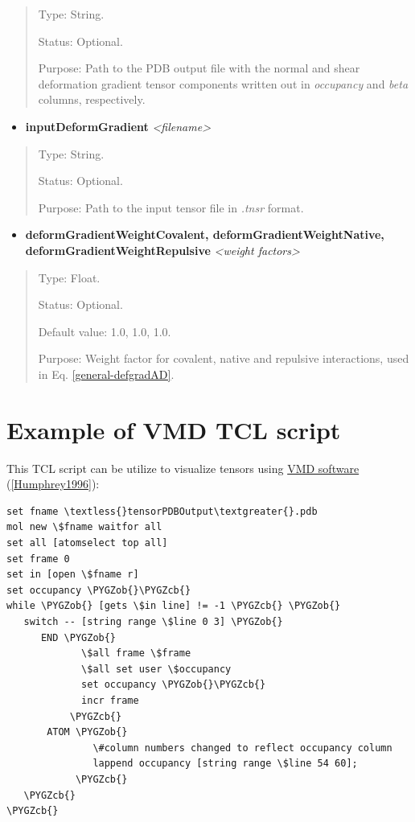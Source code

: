 \documentclass[letterpaper,10pt,english]{sphinxmanual}
\def\PYGZob{\char`\{}
\def\PYGZcb{\char`\}}
\begin{document}
\begin{quote}

Type: String.

Status: Optional.

Purpose:  Path to the PDB output file with the normal and shear deformation gradient tensor components written out in \emph{occupancy} and \emph{beta} columns, respectively.
\end{quote}
\begin{itemize}
\item {} 
\textbf{inputDeformGradient} \emph{\textless{}filename\textgreater{}}

\end{itemize}
\begin{quote}

Type: String.

Status: Optional.

Purpose:  Path to the input tensor file in \emph{.tnsr} format.
\end{quote}
\begin{itemize}
\item {} 
\textbf{deformGradientWeightCovalent, deformGradientWeightNative, deformGradientWeightRepulsive} \emph{\textless{}weight factors\textgreater{}}

\end{itemize}
\begin{quote}

Type: Float.

Status: Optional.

Default value: 1.0, 1.0, 1.0.

Purpose: Weight factor for covalent, native and repulsive interactions, used in Eq. \eqref{general-defgradAD}.
\end{quote}


\section{Example of VMD TCL script}
\label{general:example-of-vmd-tcl-script}\label{general:tclscrpt}
This TCL script can be utilize to visualize tensors using \href{http://www.ks.uiuc.edu/Research/vmd/}{VMD software} ({\hyperref[general:humphrey1996]{{[}Humphrey1996{]}}}):

\begin{Verbatim}[commandchars=\\\{\}]
set fname \textless{}tensorPDBOutput\textgreater{}.pdb
mol new \$fname waitfor all
set all [atomselect top all]
set frame 0
set in [open \$fname r]
set occupancy \PYGZob{}\PYGZcb{}
while \PYGZob{} [gets \$in line] != -1 \PYGZcb{} \PYGZob{}
   switch -- [string range \$line 0 3] \PYGZob{}
      END \PYGZob{}
             \$all frame \$frame
             \$all set user \$occupancy
             set occupancy \PYGZob{}\PYGZcb{}
             incr frame
           \PYGZcb{}
       ATOM \PYGZob{}
               \#column numbers changed to reflect occupancy column
               lappend occupancy [string range \$line 54 60];
            \PYGZcb{}
   \PYGZcb{}
\PYGZcb{}
\end{Verbatim}
\end{document}
